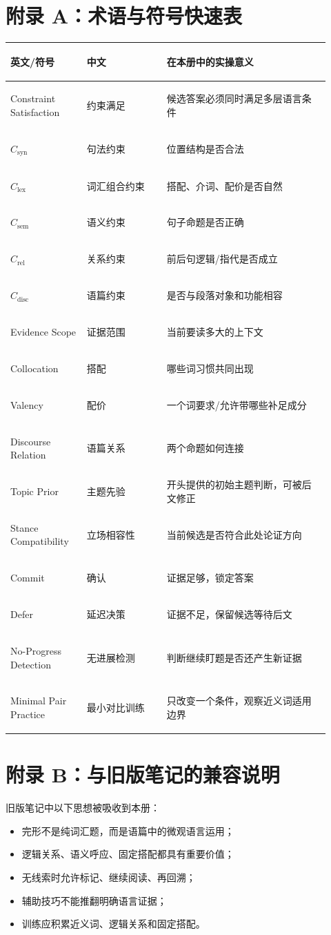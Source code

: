 \documentclass[11pt,a4paper]{ctexart}
\begin{document}
\section{附录 A：术语与符号快速表}
\small
\begin{longtable}{>{\bfseries\raggedright\arraybackslash}p{0.22\linewidth} >{\raggedright\arraybackslash}p{0.23\linewidth} >{\raggedright\arraybackslash}p{0.47\linewidth}}
\toprule
英文/符号 & 中文 & 在本册中的实操意义 \\
\midrule
Constraint Satisfaction & 约束满足 & 候选答案必须同时满足多层语言条件 \\
$C_{\text{syn}}$ & 句法约束 & 位置结构是否合法 \\
$C_{\text{lex}}$ & 词汇组合约束 & 搭配、介词、配价是否自然 \\
$C_{\text{sem}}$ & 语义约束 & 句子命题是否正确 \\
$C_{\text{rel}}$ & 关系约束 & 前后句逻辑/指代是否成立 \\
$C_{\text{disc}}$ & 语篇约束 & 是否与段落对象和功能相容 \\
Evidence Scope & 证据范围 & 当前要读多大的上下文 \\
Collocation & 搭配 & 哪些词习惯共同出现 \\
Valency & 配价 & 一个词要求/允许带哪些补足成分 \\
Discourse Relation & 语篇关系 & 两个命题如何连接 \\
Topic Prior & 主题先验 & 开头提供的初始主题判断，可被后文修正 \\
Stance Compatibility & 立场相容性 & 当前候选是否符合此处论证方向 \\
Commit & 确认 & 证据足够，锁定答案 \\
Defer & 延迟决策 & 证据不足，保留候选等待后文 \\
No-Progress Detection & 无进展检测 & 判断继续盯题是否还产生新证据 \\
Minimal Pair Practice & 最小对比训练 & 只改变一个条件，观察近义词适用边界 \\
\bottomrule
\end{longtable}
\normalsize

\section{附录 B：与旧版笔记的兼容说明}
旧版笔记中以下思想被吸收到本册：
\begin{itemize}
  \item 完形不是纯词汇题，而是语篇中的微观语言运用；
  \item 逻辑关系、语义呼应、固定搭配都具有重要价值；
  \item 无线索时允许标记、继续阅读、再回溯；
  \item 辅助技巧不能推翻明确语言证据；
  \item 训练应积累近义词、逻辑关系和固定搭配。
\end{itemize}
\end{document}
